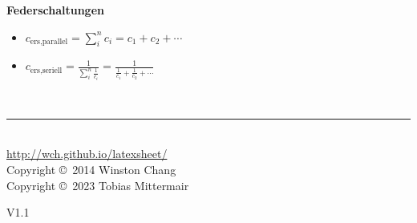\documentclass[10pt,a4paper,landscape, hidelinks]{article}
\begin{document}
\begin{multicols*}{3}
\vspace{20pt}

\textbf{Federschaltungen}
\begin{itemize}[leftmargin=*]
        \item [] $c_\text{ers,parallel}=\sum_{i}^{n}c_i=c_1+c_2+\cdots$
        \item [] $c_\text{ers,seriell}=\frac{1}{\sum_{i}^{n}\frac{1}{c_i}}=\frac{1}{\frac{1}{c_1}+\frac{1}{c_2}+\cdots}$
\end{itemize}

\par\vfill\null
\columnbreak

 
\vfill


\tabto{6.3cm}\rule{0.3\linewidth}{0.25pt}\\
\tiny
\tabto{6.3cm}\href{http://wch.github.io/latexsheet/}{http://wch.github.io/latexsheet/}\\
\tabto{6.3cm}Copyright \copyright\ 2014 Winston Chang\\
\tabto{6.3cm}Copyright \copyright\ 2023 Tobias Mittermair
\begin{flushright}
        {\normalsize V1.1}\\
\end{flushright}


\end{multicols*}
\end{document}
